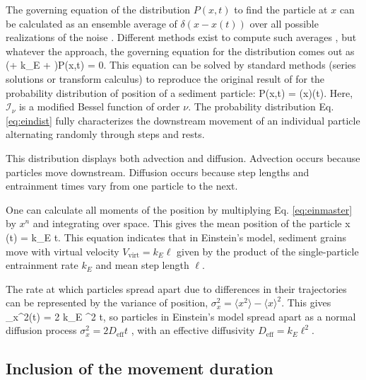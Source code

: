 The governing equation of the distribution $P(x,t)$ to find the particle at $x$ can be calculated as an ensemble average of $\delta(x-x(t))$ over all possible realizations of the noise \citep{Risken1989,Moss1989}. Different methods exist to compute such averages \citep{Hanggi1978, Hanggi1984a, Balakrishnan1993, VanDenBroeck1983}, but whatever the approach, the governing equation for the distribution comes out as
\be  \big(\ell \px \pt + k_E \ell \px + \pt \big)P(x,t) = 0. \label{eq:einmaster}\ee
This equation can be solved by standard methods (series solutions or transform calculus) \citep{Arfken1985,Prudnikov1992a} to reproduce the original result of \citet{Einstein1937} for the probability distribution of position of a sediment particle:
\be P(x,t) = \theta(x)\theta(t). \label{eq:eindist} \ee
Here, $\mathcal{I}_\nu$ is a modified Bessel function of order $\nu$. 
The probability distribution Eq. \ref{eq:eindist} fully characterizes the downstream movement of an individual particle alternating randomly through steps and rests.

This distribution displays both advection and diffusion. Advection occurs because particles move downstream. Diffusion occurs because step lengths and entrainment times vary from one particle to the next.

One can calculate all moments of the position by multiplying Eq. \ref{eq:einmaster} by $x^n$ and integrating over space. This gives the mean position of the particle
\be \langle x (t)  \rangle = k_E \ell t. \ee
This equation indicates that in Einstein's model, sediment grains move with virtual velocity $V_\text{virt} = k_E \ell$ given by the product of the single-particle entrainment rate $k_E$ and mean step length $\ell$.

The rate at which particles spread apart due to differences in their trajectories can be represented by the variance of position, $\sigma_x^2  = \langle x^2 \rangle - \langle x \rangle^2$. This gives
\be \sigma_x^2(t) = 2 k_E \ell^2 t, \ee
so particles in Einstein's model spread apart as a normal diffusion process $\sigma_x^2 = 2 D_\text{eff} t$ \citep{Sokolov2012}, with an effective diffusivity $D_\text{eff} = k_E \ell^2.$

\subsection{Inclusion of the movement duration}
\label{sec:lisle}


